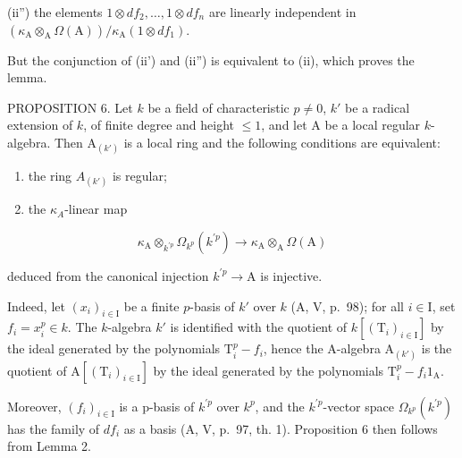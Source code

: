 (ii'') the elements \(1 \otimes df_2, \ldots, 1 \otimes df_n\) are linearly independent in \((\kappa_{\mathrm{A}} \otimes_{\mathrm{A}} \Omega(\mathrm{A})) / \kappa_{\mathrm{A}}(1 \otimes df_1)\).

But the conjunction of (ii') and (ii'') is equivalent to (ii), which proves the lemma.

PROPOSITION 6. Let \(k\) be a field of characteristic \(p \neq 0\), \(k'\) be a radical extension of \(k\), of finite degree and height \(\leqslant 1\), and let A be a local regular \(k\)-algebra. Then \(\mathrm{A}_{(k')}\) is a local ring and the following conditions are equivalent:

\begin{enumerate}
\def\labelenumi{(\roman{enumi})}
\item
  the ring \(A_{(k')}\) is regular;
\item
  the \(\kappa_{A}\)-linear map
\end{enumerate}

\[
\kappa_ {\mathrm{A}} \otimes_ {k ^ {\prime p}} \Omega_ {k ^ {p}} (k ^ {\prime p}) \longrightarrow \kappa_ {\mathrm{A}} \otimes_ {\mathrm{A}} \Omega (\mathrm{A})
\]

deduced from the canonical injection \(k^{\prime p}\to \mathrm{A}\) is injective.

Indeed, let \((x_{i})_{i\in \mathrm{I}}\) be a finite \(p\)-basis of \(k'\) over \(k\) (A, V, p.~98); for all \(i\in \mathrm{I}\), set \(f_{i} = x_{i}^{p}\in k\). The \(k\)-algebra \(k'\) is identified with the quotient of \(k[(\mathrm{T}_i)_{i\in \mathrm{I}}]\) by the ideal generated by the polynomials \(\mathrm{T}_i^p - f_i\), hence the A-algebra \(\mathrm{A}_{(k')}\) is the quotient of \(\mathrm{A}[(\mathrm{T}_i)_{i\in \mathrm{I}}]\) by the ideal generated by the polynomials \(\mathrm{T}_i^p - f_i1_{\mathrm{A}}\).

Moreover, \((f_{i})_{i\in\mathrm{I}}\) is a p-basis of \(k^{\prime p}\) over \(k^{p}\), and the \(k^{\prime p}\)-vector space \(\Omega_{k^{p}}(k^{\prime p})\) has the family of \(df_{i}\) as a basis (A, V, p.~97, th. 1). Proposition 6 then follows from Lemma 2.

